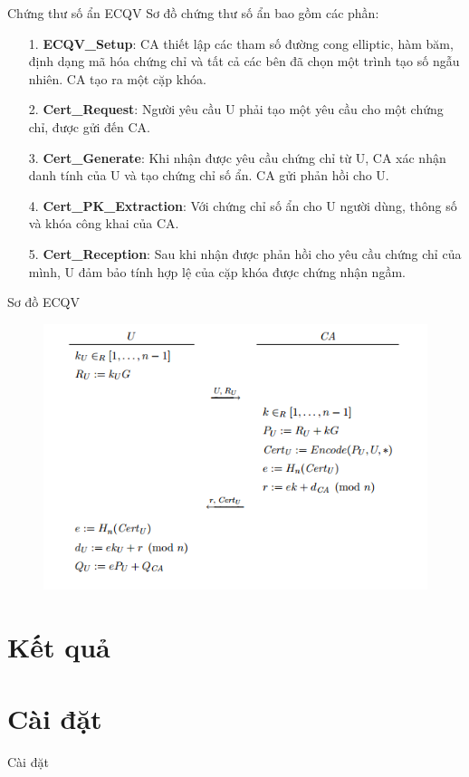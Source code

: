 \documentclass[compress]{beamer}
\begin{document}
\begin{frame}{Chứng thư số ẩn ECQV}
Sơ đồ chứng thư số ẩn bao gồm các phần:
\small{
\begin{itemize}
\item[1. ] \textbf{ECQV\_Setup}: CA thiết lập các tham số đường cong elliptic, hàm băm, định dạng mã hóa chứng chỉ và tất cả các bên đã chọn một trình tạo số ngẫu nhiên. CA tạo ra một cặp khóa.
\item[2. ] \textbf{Cert\_Request}: Người yêu cầu U phải tạo một yêu cầu cho một chứng chỉ, được gửi đến CA.
\item[3. ] \textbf{Cert\_Generate}: Khi nhận được yêu cầu chứng chỉ từ U, CA xác nhận danh tính của U và tạo chứng chỉ số ẩn. CA gửi phản hồi cho U.
\item[4. ] \textbf{Cert\_PK\_Extraction}: Với chứng chỉ số ẩn cho U người dùng, thông số và khóa công khai của CA.
\item[5. ] \textbf{Cert\_Reception}: Sau khi nhận được phản hồi cho yêu cầu chứng chỉ của mình, U đảm bảo tính hợp lệ của cặp khóa được chứng nhận ngầm.
\end{itemize}
}
\end{frame}
\begin{frame}{Sơ đồ ECQV}
\begin{center}
\begin{figure}[h]
\centering
\includegraphics[width=0.85\linewidth]{../im8.png}
\end{figure}
\end{center}
\end{frame}
\section{Kết quả}
\section*{Cài đặt}
\begin{frame}{Cài đặt}

\end{frame}
\end{document}
